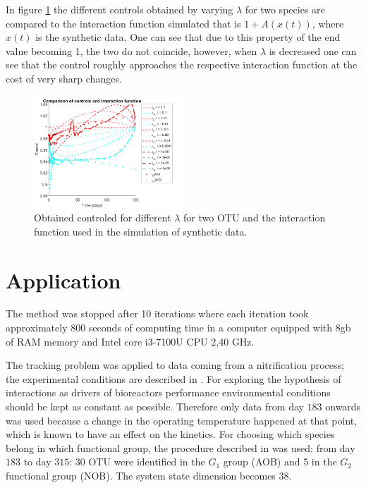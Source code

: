\documentclass[3p,times]{elsarticle}
\begin{document}
In figure \ref{Comparison_lambda} the different controls obtained by varying $\lambda$ for two species are compared to the interaction function simulated that is $1+A(x(t))$, where $x(t)$ is the synthetic data. One can see that due to this property of the end value becoming 1, the two do not coincide, however, when $\lambda$ is decreased one can see that the control roughly approaches the respective interaction function at the cost of very sharp changes.

\begin{figure}[h]
	\centering
	\includegraphics[width=0.5\textwidth]{Synthetic_data//Comparison_different_control}
	\caption{Obtained controled for different $\lambda$ for two OTU and the interaction function used in the simulation of synthetic data.}
	\label{Comparison_lambda}
\end{figure}

\clearpage
\section{Application}
 
The method was stopped after 10 iterations where each iteration took approximately 800 seconds of computing time in a computer equipped with 8gb of RAM memory and Intel core i3-7100U CPU 2,40 GHz.

The tracking problem was applied to data coming from a nitrification process; the experimental conditions are described in \cite{dumont2008observers}. For exploring the hypothesis of interactions as drivers of bioreactors performance environmental conditions should be kept as constant as possible. Therefore only data from day $183$ onwards was used because a change in the operating temperature happened at that point, which is known to have an effect on the kinetics. For choosing which species belong in which functional group, the procedure described in \cite{Ugalde-Salas2019} was used: from day $183$ to day $315$: 30 OTU were identified in the $G_1$ group (AOB) and 5 in the $G_2$ functional group (NOB). The system state dimension becomes 38.
\end{document}
